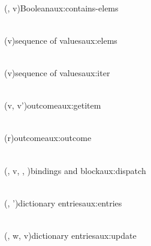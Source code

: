 \begin{auxfunction}{\memElems(, v)}{Boolean}{aux:contains-elems}

\begin{align*}

\end{align*}
\end{auxfunction}

\begin{auxfunction}{\elems(v)}{sequence of values}{aux:elems}

\begin{align*}

\end{align*}
\end{auxfunction}

\begin{auxfunction}{\iterOp(v)}{sequence of values}{aux:iter}

\begin{align*}

\end{align*}
\end{auxfunction}

\begin{auxfunction}{\getitem(v, v')}{outcome}{aux:getitem}

\begin{align*}

\end{align*}
\end{auxfunction}

\begin{auxfunction}{\outcome(r)}{outcome}{aux:outcome}

\begin{align*}

\end{align*}
\end{auxfunction}

\begin{auxfunction}{\dispatch(\rho, v, , )}{bindings and block}{aux:dispatch}

\begin{align*}

\end{align*}
\end{auxfunction}

\begin{auxfunction}{\entries(\delta, \delta')}{dictionary entries}{aux:entries}

\begin{align*}

\end{align*}
\end{auxfunction}

\begin{auxfunction}{\update(\delta, w, v)}{dictionary entries}{aux:update}

\begin{align*}

\end{align*}
\end{auxfunction}
